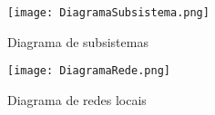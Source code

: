              \begin{figure}[H]
              \begin{center}
                  \caption{Diagrama de subsistemas } \label{afp}
                  \texttt{[image: DiagramaSubsistema.png]} \\

              \end{center}
             \end{figure}
\begin{figure}[H]
              \begin{center}
                  \caption{ Diagrama de redes locais} \label{afp}
                  \texttt{[image: DiagramaRede.png]} \\

              \end{center}
             \end{figure}

